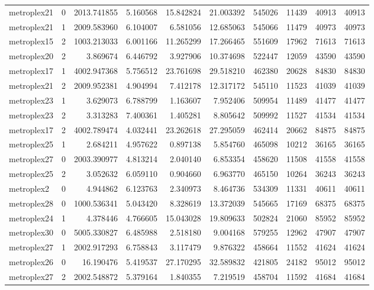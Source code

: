 \begin{longtable}{|l|r|r|r|r|r|r|r|r|r|}
metroplex21 & 0 & 2013.741855 & 5.160568 & 15.842824 & 21.003392 & 545026 & 11439 & 40913 & 40913 \\
metroplex21 & 1 & 2009.583960 & 6.104007 & 6.581056 & 12.685063 & 545066 & 11479 & 40973 & 40973 \\
metroplex15 & 2 & 1003.213033 & 6.001166 & 11.265299 & 17.266465 & 551609 & 17962 & 71613 & 71613 \\
metroplex20 & 2 & 3.869674 & 6.446792 & 3.927906 & 10.374698 & 522447 & 12059 & 43590 & 43590 \\
metroplex17 & 1 & 4002.947368 & 5.756512 & 23.761698 & 29.518210 & 462380 & 20628 & 84830 & 84830 \\
metroplex21 & 2 & 2009.952381 & 4.904994 & 7.412178 & 12.317172 & 545110 & 11523 & 41039 & 41039 \\
metroplex23 & 1 & 3.629073 & 6.788799 & 1.163607 & 7.952406 & 509954 & 11489 & 41477 & 41477 \\
metroplex23 & 2 & 3.313283 & 7.400361 & 1.405281 & 8.805642 & 509992 & 11527 & 41534 & 41534 \\
metroplex17 & 2 & 4002.789474 & 4.032441 & 23.262618 & 27.295059 & 462414 & 20662 & 84875 & 84875 \\
metroplex25 & 1 & 2.684211 & 4.957622 & 0.897138 & 5.854760 & 465098 & 10212 & 36165 & 36165 \\
metroplex27 & 0 & 2003.390977 & 4.813214 & 2.040140 & 6.853354 & 458620 & 11508 & 41558 & 41558 \\
metroplex25 & 2 & 3.052632 & 6.059110 & 0.904660 & 6.963770 & 465150 & 10264 & 36243 & 36243 \\
metroplex2 & 0 & 4.944862 & 6.123763 & 2.340973 & 8.464736 & 534309 & 11331 & 40611 & 40611 \\
metroplex28 & 0 & 1000.536341 & 5.043420 & 8.328619 & 13.372039 & 545665 & 17169 & 68375 & 68375 \\
metroplex24 & 1 & 4.378446 & 4.766605 & 15.043028 & 19.809633 & 502824 & 21060 & 85952 & 85952 \\
metroplex30 & 0 & 5005.330827 & 6.485988 & 2.518180 & 9.004168 & 579255 & 12962 & 47907 & 47907 \\
metroplex27 & 1 & 2002.917293 & 6.758843 & 3.117479 & 9.876322 & 458664 & 11552 & 41624 & 41624 \\
metroplex26 & 0 & 16.190476 & 5.419537 & 27.170295 & 32.589832 & 421805 & 24182 & 95012 & 95012 \\
metroplex27 & 2 & 2002.548872 & 5.379164 & 1.840355 & 7.219519 & 458704 & 11592 & 41684 & 41684 \\

\end{longtable}
